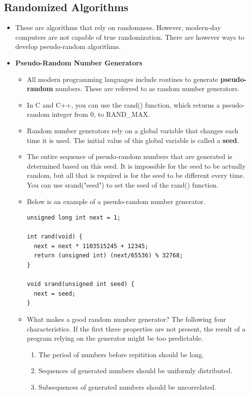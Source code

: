 \documentclass{article}
\begin{document}
\subsection*{Randomized Algorithms}
\begin{itemize}
    \item These are algorithms that rely on randomness. However, modern-day computers are not capable of true randomization. There are however ways to develop pseudo-random algorithms.
    \item \textbf{Pseudo-Random Number Generators}
    \begin{itemize}
        \item All modern programming languages include routines to generate \textbf{pseudo-random} numbers. These are referred to as random number generators.
        \item In C and C++, you can use the rand() function, which returns a pseudo-random integer from 0, to RAND\_MAX.
        \item Random number generators rely on a global variable that changes each time it is used. The initial value of this global variable is called a \textbf{seed}.
        \item The entire sequence of pseudo-random numbers that are generated is determined based on this seed. It is impossible for the seed to be actually random, but all that is required is for the seed to be different every time. You can use srand("seed") to set the seed of the rand() function.
        \item Below is an example of a pseudo-random number generator.
\begin{verbatim}
unsigned long int next = 1;
 
int rand(void) {
  next = next * 1103515245 + 12345;
  return (unsigned int) (next/65536) % 32768;
}
 
void srand(unsigned int seed) {
  next = seed;
}
\end{verbatim}
        \item What makes a good random number generator? The following four characteristics. If the first three properties are not present, the result of a program relying on the generator might be too predictable.
        \begin{enumerate}
            \item The period of numbers before repitition should be long.
            \item Sequences of generated numbers should be uniformly distributed.
            \item Subsequences of generated numbers should be uncorrelated.

\end{enumerate}
\end{itemize}
\end{itemize}
\end{document}
